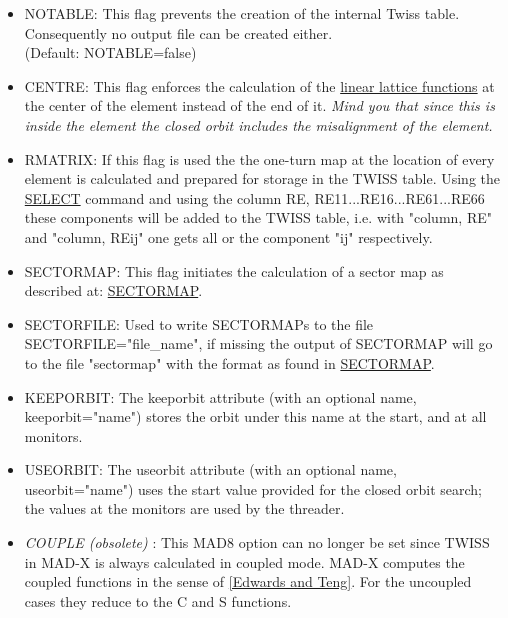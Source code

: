 \begin{itemize}
   \item NOTABLE: This flag prevents the creation of the internal Twiss
     table. Consequently no output file can be created either.  \\ 
     (Default: NOTABLE=false)

   \item CENTRE: This flag enforces the calculation of the
     \href{../Introduction/tables.html#linear}{linear lattice
       functions} at the center of the element instead of the end
     of it. \textit{ Mind you that since this is inside the element
       the closed orbit includes the misalignment of the element.} 

   \item RMATRIX: If this flag is used the the one-turn map at the
     location of every element is calculated and prepared for
     storage in the TWISS table. Using the
     \href{../Introduction/select.html}{SELECT} command and using
     the column RE, RE11...RE16...RE61...RE66 these components will
     be added to the TWISS table, i.e. with "column, RE" and
     "column, REij" one gets all or the component "ij"
     respectively.    

   \item SECTORMAP: This flag initiates the calculation of a sector
     map as described at:
     \href{../Introduction/sectormap.html}{SECTORMAP}.    

   \item SECTORFILE: Used to write SECTORMAPs to the file
     SECTORFILE="file\_name", if missing the output of SECTORMAP
     will go to the file "sectormap" with the format as found in
     \href{../Introduction/sectormap.html}{SECTORMAP}.    

   \item KEEPORBIT: The keeporbit attribute (with an optional name,
     keeporbit="name") stores the orbit under this name at the
     start, and at all monitors.    

   \item USEORBIT: The useorbit attribute (with an optional name,
     useorbit="name") uses the start value provided for the closed
     orbit search; the values at the monitors are used by the
     threader.    

   \item \textit{COUPLE (obsolete)} : This MAD8 option can no
     longer be set since TWISS in MAD-X is always calculated in
     coupled mode. MAD-X computes the coupled functions in the
     sense of
     \href{../Introduction/bibliography.html#edwards}{[Edwards and
         Teng]}. For the uncoupled cases they reduce to the C and S
     functions.    


\end{itemize}
